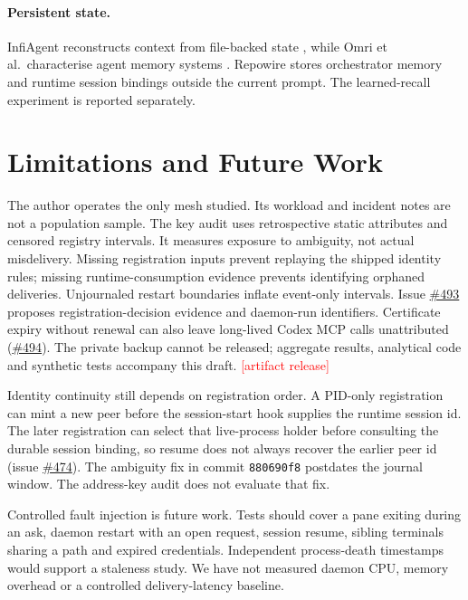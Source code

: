\documentclass[10pt,twocolumn]{article}
\newcommand{\todo}[1]{\textcolor{red}{[#1]}}
\newcommand{\sys}{Repowire}
\newcommand{\code}[1]{\texttt{#1}}
\begin{document}
\paragraph{Persistent state.}
InfiAgent reconstructs context from file-backed state \citep{infiagent2026}, while Omri et al.\ characterise agent memory systems \citep{agentmemory2026}. \sys{} stores orchestrator memory and runtime session bindings outside the current prompt. The learned-recall experiment is reported separately.

\section{Limitations and Future Work}
\label{sec:limits}

The author operates the only mesh studied. Its workload and incident notes are not a population sample. The key audit uses retrospective static attributes and censored registry intervals. It measures exposure to ambiguity, not actual misdelivery. Missing registration inputs prevent replaying the shipped identity rules; missing runtime-consumption evidence prevents identifying orphaned deliveries. Unjournaled restart boundaries inflate event-only intervals. Issue \href{https://github.com/prassanna-ravishankar/repowire/issues/493}{\#493} proposes registration-decision evidence and daemon-run identifiers. Certificate expiry without renewal can also leave long-lived Codex MCP calls unattributed (\href{https://github.com/prassanna-ravishankar/repowire/issues/494}{\#494}). The private backup cannot be released; aggregate results, analytical code and synthetic tests accompany this draft. \todo{artifact release}

Identity continuity still depends on registration order. A PID-only registration can mint a new peer before the session-start hook supplies the runtime session id. The later registration can select that live-process holder before consulting the durable session binding, so resume does not always recover the earlier peer id (issue \href{https://github.com/prassanna-ravishankar/repowire/issues/474}{\#474}). The ambiguity fix in commit \code{880690f8} postdates the journal window. The address-key audit does not evaluate that fix.

Controlled fault injection is future work. Tests should cover a pane exiting during an ask, daemon restart with an open request, session resume, sibling terminals sharing a path and expired credentials. Independent process-death timestamps would support a staleness study. We have not measured daemon CPU, memory overhead or a controlled delivery-latency baseline.
\end{document}
